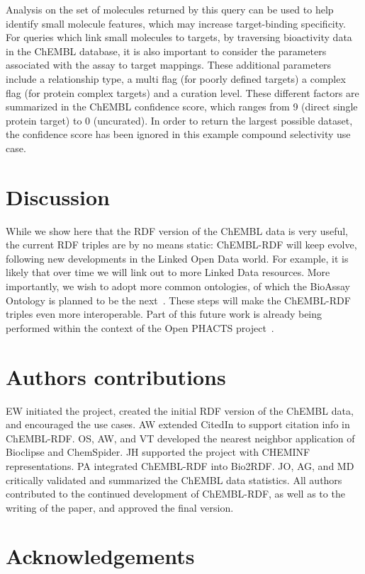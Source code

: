 \documentclass[10pt]{bmc_article}
\newenvironment{bmcformat}{\begin{raggedright}\baselineskip20pt\sloppy\setboolean{publ}{false}}{\end{raggedright}\baselineskip20pt\sloppy}
\begin{document}
\begin{bmcformat}
Analysis on the set of molecules returned by this query can be used to help identify small 
molecule features, which may increase target-binding specificity. For queries which link 
small molecules to targets, by traversing bioactivity data in the ChEMBL database, it is 
also important to consider the parameters associated with the assay to target mappings. 
These additional parameters include a relationship type, a multi flag (for poorly defined
targets) a complex flag (for protein complex targets) and a curation level. These different 
factors are summarized in the ChEMBL confidence score, which ranges from 9 (direct single 
protein target) to 0 (uncurated). In order to return the largest possible dataset, the 
confidence score has been ignored in this example compound selectivity use case.

\section*{Discussion}

While we show here that the RDF version of the ChEMBL data is very useful, the current RDF triples are by no means static: ChEMBL-RDF
will keep evolve, following new developments in the Linked Open Data world. For example, it is likely that over time we will link out
to more Linked Data resources. More importantly, we wish to adopt more common ontologies, of which the BioAssay Ontology is planned
to be the next~\cite{Visser2011}. These steps will make the ChEMBL-RDF triples even more interoperable. Part of this future work
is already being performed within the context of the Open PHACTS project~\cite{Williams2012}.

\section*{Authors contributions}
EW initiated the project, created the initial RDF version of the ChEMBL data, and encouraged the use cases.
AW extended CitedIn to support citation info in ChEMBL-RDF.
OS, AW, and VT developed the nearest neighbor application of Bioclipse and ChemSpider.
JH supported the project with CHEMINF representations.
PA integrated ChEMBL-RDF into Bio2RDF.
JO, AG, and MD critically validated and summarized the ChEMBL data statistics.
All authors contributed to the continued development of ChEMBL-RDF, as well as to the writing of the paper,
and approved the final version.

\section*{Acknowledgements}


\end{bmcformat}
\end{document}
